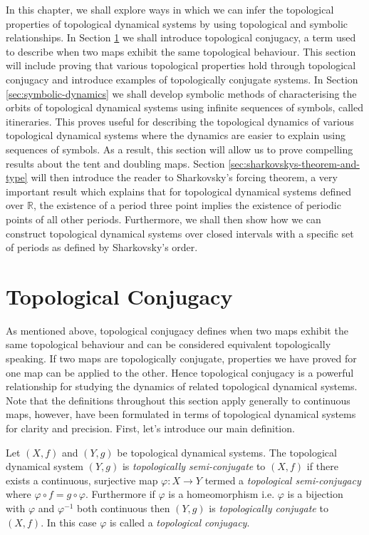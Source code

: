 In this chapter, we shall explore ways in which we can infer the topological properties of topological dynamical systems by using topological and symbolic relationships. In Section \ref{sec:topological-conjugacy} we shall introduce topological conjugacy, a term used to describe when two maps exhibit the same topological behaviour. This section will include proving that various topological properties hold through topological conjugacy and introduce examples of topologically conjugate systems. In Section \ref{sec:symbolic-dynamics} we shall develop symbolic methods of characterising the orbits of topological dynamical systems using infinite sequences of symbols, called itineraries. This proves useful for describing the topological dynamics of various topological dynamical systems where the dynamics are easier to explain using sequences of symbols. As a result, this section will allow us to prove compelling results about the tent and doubling maps. Section \ref{sec:sharkovskys-theorem-and-type} will then introduce the reader to Sharkovsky's forcing theorem, a very important result which explains that for topological dynamical systems defined over $\mathbb{R}$, the existence of a period three point implies the existence of periodic points of all other periods. Furthermore, we shall then show how we can construct topological dynamical systems over closed intervals with a specific set of periods as defined by Sharkovsky's order.

\section{Topological Conjugacy} \label{sec:topological-conjugacy}
As mentioned above, topological conjugacy defines when two maps exhibit the same topological behaviour and can be considered equivalent topologically speaking. If two maps are topologically conjugate, properties we have proved for one map can be applied to the other. Hence topological conjugacy is a powerful relationship for studying the dynamics of related topological dynamical systems. Note that the definitions throughout this section apply generally to continuous maps, however, have been formulated in terms of topological dynamical systems for clarity and precision. First, let's introduce our main definition.

\begin{defn} \label{defn:topological-conjugacy}
    Let $(X, f)$ and $(Y, g)$ be topological dynamical systems. The topological dynamical system $(Y, g)$ is \emph{topologically semi-conjugate} to $(X, f)$ if there exists a continuous, surjective map $\varphi: X \to Y$ termed a \emph{topological semi-conjugacy} where $\varphi \circ f = g \circ \varphi$. Furthermore if $\varphi$ is a homeomorphism i.e. $\varphi$ is a bijection with $\varphi$ and $\varphi^{-1}$ both continuous then $(Y, g)$ is \emph{topologically conjugate} to $(X, f)$. In this case $\varphi$ is called a \emph{topological conjugacy}.
\end{defn}

